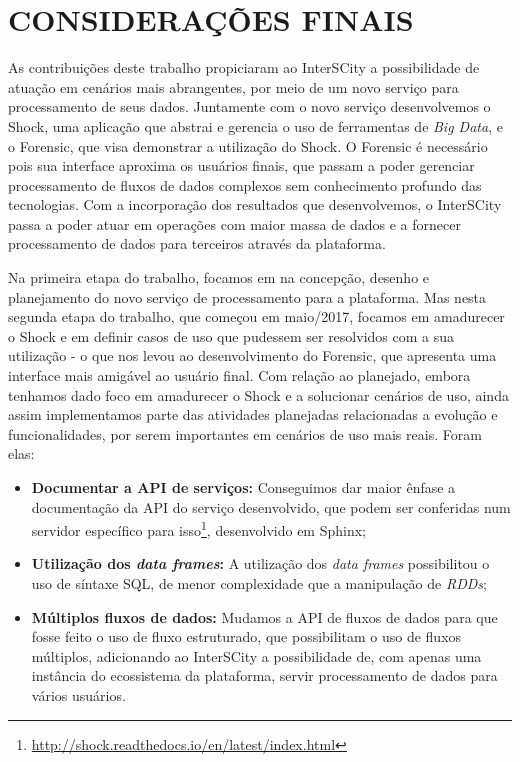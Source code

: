 \chapter{CONSIDERAÇÕES FINAIS}
\label{chapter:final}

As contribuições deste trabalho propiciaram ao InterSCity a possibilidade de
atuação em cenários mais abrangentes, por meio de um novo serviço
para processamento de seus dados. Juntamente com o novo serviço desenvolvemos
o Shock, uma aplicação que abstrai e gerencia o uso de ferramentas de
\textit{Big Data}, e o Forensic, que visa demonstrar a utilização do Shock.
O Forensic é necessário pois sua interface aproxima os usuários finais, que
passam a poder gerenciar processamento de fluxos de dados complexos sem
conhecimento profundo das tecnologias.
Com a incorporação dos resultados que desenvolvemos, o InterSCity passa a poder
atuar em operações com maior massa de dados e a fornecer processamento de dados
para terceiros através da plataforma.

Na primeira etapa do trabalho, focamos em na concepção, desenho e planejamento
do novo serviço de processamento para a plataforma.
Mas nesta segunda etapa do trabalho, que começou em maio/2017, focamos em
amadurecer o Shock e em definir casos de uso que pudessem ser resolvidos com
a sua utilização - o que nos levou ao desenvolvimento do Forensic, que apresenta
uma interface mais amigável ao usuário final. Com relação ao planejado, embora
tenhamos dado foco em amadurecer o Shock e a solucionar cenários de uso, ainda
assim implementamos parte das atividades planejadas relacionadas a evolução e
funcionalidades, por serem importantes em cenários de uso mais reais. Foram
elas:

\begin{itemize}
    \item \textbf{Documentar a API de serviços:} Conseguimos dar maior ênfase a
        documentação da API do serviço desenvolvido, que podem ser conferidas
        num servidor específico para
        isso\footnote{\url{http://shock.readthedocs.io/en/latest/index.html}},
        desenvolvido em Sphinx;
    \item \textbf{Utilização dos \textit{data frames}:} A utilização dos
        \textit{data frames} possibilitou o uso de síntaxe SQL, de menor
        complexidade que a manipulação de \textit{RDDs};
    \item \textbf{Múltiplos fluxos de dados:} Mudamos a API de fluxos de dados
        para que fosse feito o uso de fluxo estruturado, que
        possibilitam o uso de fluxos múltiplos, adicionando ao
        InterSCity a possibilidade de, com apenas uma instância do ecossistema
        da plataforma, servir processamento de dados para vários usuários.
\end{itemize}

